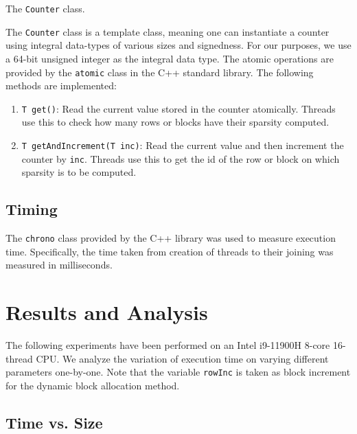 \documentclass[conference,compsoc]{IEEEtran}
\begin{document}
\begin{listing}[!ht]
\inputminted{cpp}{codes/Counter.cpp}
\caption{The \texttt{Counter} class.}
\label{code:Counter}
\end{listing}

The \texttt{Counter} class is a template class, meaning one can instantiate a
counter using integral data-types of various sizes and signedness. For our
purposes, we use a 64-bit unsigned integer as the integral data type. The atomic
operations are provided by the \texttt{atomic} class in the C++ standard
library. The following methods are implemented:

\begin{enumerate}
    \item \texttt{T get()}: Read the current value stored in the counter
    atomically. Threads use this to check how many rows or blocks have their
    sparsity computed.
    \item \texttt{T getAndIncrement(T inc)}: Read the current value and then
    increment the counter by \texttt{inc}. Threads use this to get the id of the
    row or block on which sparsity is to be computed. 
\end{enumerate}

\subsection{Timing}
\label{sec:timing}

The \texttt{chrono} class provided by the C++ library was used to measure
execution time. Specifically, the time taken from creation of threads to their
joining was measured in milliseconds. 

\section{Results and Analysis}
\label{sec:results-and-analysis}

The following experiments have been performed on an Intel i9-11900H 8-core
16-thread CPU. We analyze the variation of execution time on varying different
parameters one-by-one. Note that the variable \texttt{rowInc} is taken as block
increment for the dynamic block allocation method.

\subsection{Time vs. Size}
\label{subsec:time-vs-size}
\end{document}
